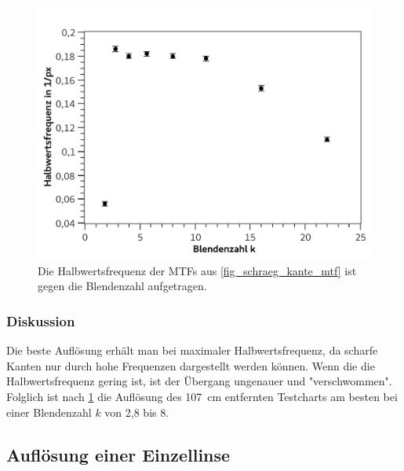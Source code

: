 \documentclass[
	a4paper,
	12pt,
	pagesize,
	ngerman
]{scrartcl}
\begin{document}
	\begin{figure}[H]  
		\includegraphics[width=1\textwidth]{fig_schraeg_kant_2}
		\centering
		\caption{
			Die Halbwertsfrequenz der MTFs aus \cref{fig_schraeg_kante_mtf} ist gegen die Blendenzahl aufgetragen.
			}
		\label{fig_schraeg_kante}
		\centering
	\end{figure}

	\subsubsection{Diskussion}
	Die beste Auflösung erhält man bei maximaler Halbwertsfrequenz, da scharfe Kanten nur durch hohe Frequenzen dargestellt werden können. 
	Wenn die die Halbwertsfrequenz gering ist, ist der Übergang ungenauer und "verschwommen".
	Folglich ist nach \cref{fig_schraeg_kante} die Auflösung des \SI{107}{cm} entfernten Testcharts am besten bei einer Blendenzahl $k$ von 2,8 bis 8.
	
	\subsection{Auflösung einer Einzellinse} \label{ss_einzellinse}
\end{document}

